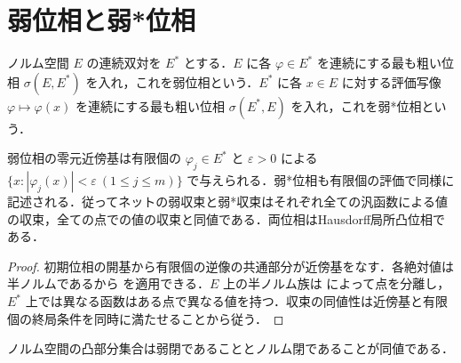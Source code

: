 \section{弱位相と弱*位相}
\begin{defn}[弱位相と弱*位相]
ノルム空間 $E$ の連続双対を $E^*$ とする．$E$ に各 $\varphi\in E^*$ を連続にする最も粗い位相 $\sigma(E,E^*)$ を入れ，これを弱位相という．$E^*$ に各 $x\in E$ に対する評価写像 $\varphi\mapsto\varphi(x)$ を連続にする最も粗い位相 $\sigma(E^*,E)$ を入れ，これを弱*位相という．
\end{defn}
\begin{prop}[弱位相の近傍と収束]
弱位相の零元近傍基は有限個の $\varphi_j\in E^*$ と $\varepsilon>0$ による $\{x:|\varphi_j(x)|<\varepsilon\ (1\leq j\leq m)\}$ で与えられる．弱*位相も有限個の評価で同様に記述される．従ってネットの弱収束と弱*収束はそれぞれ全ての汎函数による値の収束，全ての点での値の収束と同値である．両位相はHausdorff局所凸位相である．
\end{prop}
\begin{proof}
初期位相の開基から有限個の逆像の共通部分が近傍基をなす．各絶対値は半ノルムであるから  を適用できる．$E$ 上の半ノルム族は  によって点を分離し，$E^*$ 上では異なる函数はある点で異なる値を持つ．収束の同値性は近傍基と有限個の終局条件を同時に満たせることから従う．
\end{proof}
\begin{prop}[弱閉凸集合とノルム閉凸集合]
ノルム空間の凸部分集合は弱閉であることとノルム閉であることが同値である．
\end{prop}
